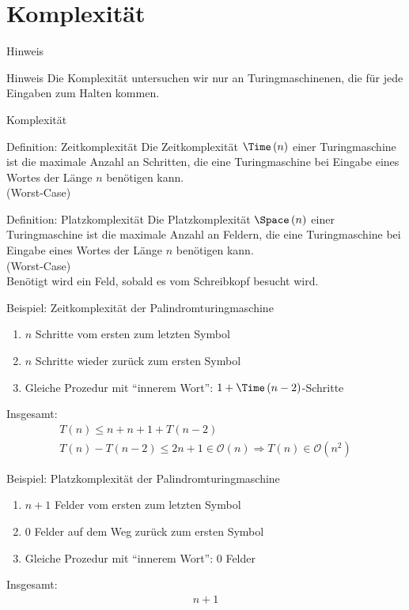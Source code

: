 \section{Komplexität}
\begin{frame}{Hinweis}
    \begin{alertblock}{Hinweis}
        Die Komplexität untersuchen wir nur an Turingmaschinenen, die für jede Eingaben zum Halten kommen.
    \end{alertblock}
\end{frame}
\begin{frame}{Komplexität}
    \begin{block}{Definition: Zeitkomplexität}
        Die Zeitkomplexität $\Time\left( n \right)$ einer Turingmaschine ist die maximale Anzahl an Schritten, die eine Turingmaschine bei Eingabe eines Wortes der Länge $n$ benötigen kann.\\
        (Worst-Case)
    \end{block}
    \begin{block}{Definition: Platzkomplexität}
        Die Platzkomplexität $\Space\left( n \right)$ einer Turingmaschine ist die maximale Anzahl an Feldern, die eine Turingmaschine bei Eingabe eines Wortes der Länge $n$ benötigen kann.\\
        (Worst-Case)\\
        Benötigt wird ein Feld, sobald es vom Schreibkopf besucht wird.
    \end{block}
\end{frame}
\begin{frame}{Beispiel: Zeitkomplexität der Palindromturingmaschine}
    \begin{enumerate}
        \item $n$ Schritte vom ersten zum letzten Symbol
        \item $n$ Schritte wieder zurück zum ersten Symbol
        \item Gleiche Prozedur mit ``innerem Wort'': $1+\Time\left( n-2 \right)$-Schritte
    \end{enumerate}
    Insgesamt:
    \begin{align*}
        T\left( n \right) \leq n + n + 1 + T\left( n-2 \right)\\
        T\left( n \right) - T\left( n-2 \right) \leq 2n + 1 \in \mathcal{O}\left( n \right)
        \Rightarrow T\left( n \right) \in \mathcal{O}\left( n^2 \right)
    \end{align*}
\end{frame}
\begin{frame}{Beispiel: Platzkomplexität der Palindromturingmaschine}
    \begin{enumerate}
        \item $n + 1$ Felder vom ersten zum letzten Symbol
        \item $0$ Felder auf dem Weg zurück zum ersten Symbol
        \item Gleiche Prozedur mit ``innerem Wort'': $0$ Felder
    \end{enumerate}
    Insgesamt:
    \begin{align*}
        n+1
    \end{align*}
\end{frame}
